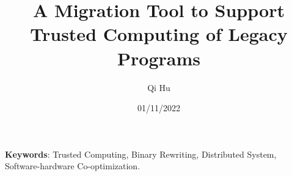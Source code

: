 \documentclass[a4paper,11pt]{article}
\title{A Migration Tool to Support Trusted Computing of Legacy Programs}
\author{Qi Hu}
\date{01/11/2022}
\newcommand\keywords[1]{\textbf{Keywords}: #1}
\begin{document}
  \maketitle%
  \keywords{Trusted Computing, Binary Rewriting, Distributed System, Software-hardware Co-optimization.}

  
  
  
  
  
  

  
  
\end{document}
